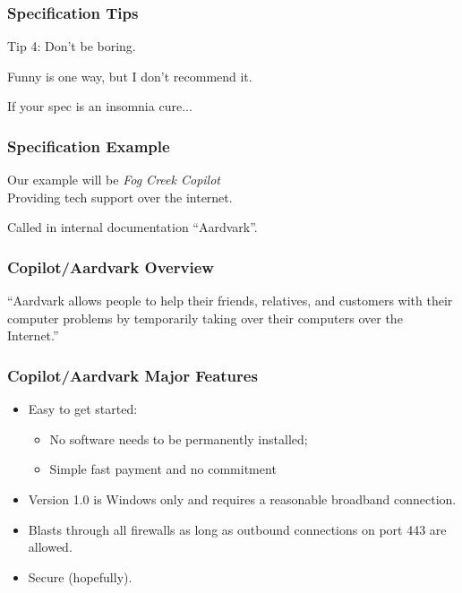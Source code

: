 \begin{frame}
\frametitle{Specification Tips}

	\begin{changemargin}{1cm}
		Tip 4: Don't be boring.
		
		Funny is one way, but I don't recommend it.
		
		If your spec is an insomnia cure...
				
	\end{changemargin}
\end{frame}

\begin{frame}
\frametitle{Specification Example}

	\begin{changemargin}{1cm}
			Our example will be \emph{Fog Creek Copilot}\\
			\quad Providing tech support over the internet.
			
			Called in internal documentation ``Aardvark''.
			
	\end{changemargin}
\end{frame}

\begin{frame}
\frametitle{Copilot/Aardvark Overview}

	\begin{changemargin}{1cm}
	
	``Aardvark allows people to help their friends, relatives, and customers with their computer problems by temporarily taking over their computers over the Internet.'' 
	
	\end{changemargin}
\end{frame}


\begin{frame}
\frametitle{Copilot/Aardvark Major Features}

	\begin{changemargin}{1cm}
	
	\begin{itemize}
	\item Easy to get started: \begin{itemize} \item No software needs to be permanently installed; \item Simple fast payment and no commitment \end{itemize}
	\item Version 1.0 is Windows only and requires a reasonable broadband connection.
	\item Blasts through all firewalls as long as outbound connections on port 443 are allowed.
	\item Secure (hopefully).
\end{itemize}

	\end{changemargin}
\end{frame}

